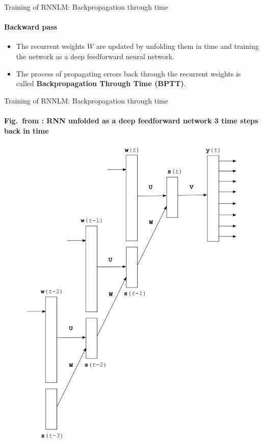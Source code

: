 \begin{frame}{Training of RNNLM: Backpropagation through time}
\framesubtitle{Backward pass}
\begin{itemize}[<+->]
	\item The recurrent weights $W$ are updated by unfolding them in time and training the network as a deep feedforward neural network.
	\item The process of propagating errors back through the recurrent weights is called \textbf{Backpropagation Through Time (BPTT)}.
\end{itemize}
\end{frame}

\begin{frame}{Training of RNNLM: Backpropagation through time}
\framesubtitle{Fig.\ from \cite{Mikolov2010}: RNN unfolded as a deep feedforward network 3 time steps back in time}
\centering
\begin{figure}
\includegraphics[scale=0.25]{figures/nlm/rnn-bptt.png}
\end{figure}
\end{frame}

